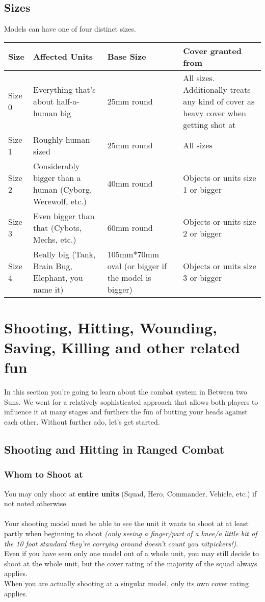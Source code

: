 \documentclass[
	11pt,
	toc=bibliography
	]{article}
\begin{document}
\subsection{Sizes}\label{sizes}
Models can have one of four distinct sizes.
{\renewcommand{\arraystretch}{2}
\begin{longtable}{V{.1\textwidth} V{.25\textwidth} V{.2\textwidth} V{.25\textwidth}}
\bf Size & \bf Affected Units  & \bf Base Size & \bf Cover granted from\\ 
\hline 
Size 0 & Everything that's about half-a-human big & 25mm round& All sizes. Additionally treats any kind of cover as heavy cover when getting shot at\\ 
Size 1 & Roughly human-sized & 25mm round & All sizes\\ 
Size 2 & Considerably bigger than a human (Cyborg, Werewolf, etc.) & 40mm round & Objects or units size 1 or bigger\\
Size 3 & Even bigger than that (Cybots, Mechs, etc.) & 60mm round & Objects or units size 2 or bigger\\ 
Size 4 & Really big (Tank, Brain Bug, Elephant, you name it) & 105mm*70mm oval (or bigger if the model is bigger) & Objects or units size 3 or bigger\\ 
\end{longtable}}

\section{Shooting, Hitting, Wounding, Saving, Killing and other related fun}\label{combatSystem}
In this section you're going to learn about the combat system in Between two Suns. We went for a relatively sophisticated approach that allows both players to influence it at many stages and furthers the fun of butting your heads against each other. Without further ado, let's get started.

\subsection{Shooting and Hitting in Ranged Combat}\label{theShootyPart}
\subsubsection{Whom to Shoot at}\label{whomToShoot}
You may only shoot at \textbf{entire units} (Squad, Hero, Commander, Vehicle, etc.) if not noted otherwise.\\\\ 
Your shooting model must be able to see the unit it wants to shoot at at least partly when beginning to shoot \textit{(only seeing a finger/part of a knee/a little bit of the 10 foot standard they're carrying around doesn't count you nitpickers!)}. \\
Even if you have seen only one model out of a whole unit, you may still decide to shoot at the whole unit, but the cover rating of the majority of the squad always applies. \\
When you are actually shooting at a singular model, only its own cover rating applies.
\end{document}

